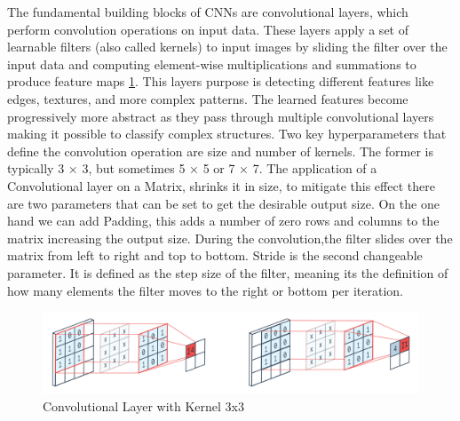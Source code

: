 \documentclass[
a4paper, 
12pt,
grayscalebody, %
abstract=on,
twoside, BCOR10mm, 12pt, DIV13,headinclude, footexclude, final, abstracton, openright
]{ibireprt}
\numberwithin{equation}{chapter}
\numberwithin{table}{chapter}
\numberwithin{figure}{chapter}
\numberwithin{algorithm}{chapter}
\numberwithin{example}{chapter}
\numberwithin{example}{chapter}
\begin{document}
The fundamental building blocks of CNNs are convolutional layers, which perform convolution operations on input data. These layers apply a set of learnable filters (also called kernels) to input images by sliding the filter over the input data and computing element-wise multiplications and summations to produce feature maps \ref{fig:fig2}. This layers purpose is detecting different features like edges, textures, and more complex patterns. The learned features become progressively more abstract as they pass through multiple convolutional layers making it possible to classify complex structures.	Two key hyperparameters that define the convolution operation are size and number of kernels. The former is typically 3 × 3, but sometimes 5 × 5 or 7 × 7. The application of a Convolutional layer on a Matrix, shrinks it in size, to mitigate this effect there are two parameters that can be set to get the desirable output size. On the one hand we can add Padding, this adds a number of zero rows and columns to the matrix increasing the output size. During the convolution,the filter slides over the matrix from left to right and top to bottom. Stride is the second changeable parameter. It is defined as the step size of the filter, meaning its the definition of how many elements the filter moves to the right or bottom per iteration.\\%

\begin{figure}[h]
	\center
	\includegraphics[width = 1 \textwidth]{Conv_Layer.png}%
	\caption{Convolutional Layer with Kernel 3x3}
	\label{fig:fig2}
\end{figure}
\end{document}
